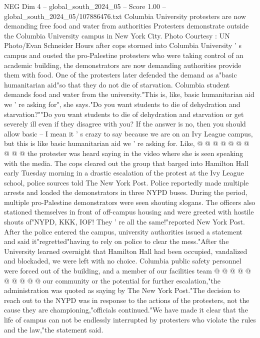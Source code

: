 \begin{textsample}{NEG Dim 4 – global\_south\_2024\_05 – Score 1.00 – global\_south\_2024\_05/107886476.txt}  \label{ex:f4_neg_272}
Columbia University protesters are now demanding free food and water from authorities Protesters demonstrate outside the Columbia University campus in New York City.
Photo Courtesy : UN Photo/Evan Schneider Hours after cops stormed into Columbia University ' s campus and ousted the pro-Palestine protesters who were taking control of an academic building, the demonstrators are now demanding authorities provide them with food.
One of the protesters later defended the demand as a"basic humanitarian aid"so that they do not die of starvation.
Columbia student demands food and water from the university."This is, like, basic humanitarian aid we ' re asking for", she says."Do you want students to die of dehydration and starvation?""Do you want students to die of dehydration and starvation or get severely ill even if they disagree with you?
If the answer is no, then you should allow basic -- I mean it ' s crazy to say because we are on an Ivy League campus, but this is like basic humanitarian aid we ' re asking for.
Like, @ @ @ @ @ @ @ @ @ @ the protester was heard saying in the video where she is seen speaking with the media.
The cops cleared out the group that barged into Hamilton Hall early Tuesday morning in a drastic escalation of the protest at the Ivy League school, police sources told The New York Post.
Police reportedly made multiple arrests and loaded the demonstrators in three NYPD buses.
During the period, multiple pro-Palestine demonstrators were seen shouting slogans.
The officers also stationed themselves in front of off-campus housing and were greeted with hostile shouts of"NYPD, KKK, IOF!
They ' re all the same!"reported New York Post.
After the police entered the campus, university authorities issued a statement and said it"regretted"having to rely on police to clear the mess."After the University learned overnight that Hamilton Hall had been occupied, vandalized and blockaded, we were left with no choice.
Columbia public safety personnel were forced out of the building, and a member of our facilities team @ @ @ @ @ @ @ @ @ @ our community or the potential for further escalation,"the administration was quoted as saying by The New York Post."The decision to reach out to the NYPD was in response to the actions of the protesters, not the cause they are championing,"officials continued."We have made it clear that the life of campus can not be endlessly interrupted by protesters who violate the rules and the law,"the statement said.

\end{textsample}
